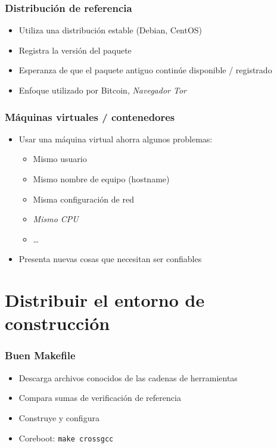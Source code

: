 \documentclass[14pt,aspectratio=169]{beamer}
\begin{document}
\begin{frame}
 \frametitle{Distribución de referencia}

 \begin{itemize}
  \item Utiliza una distribución estable (Debian, CentOS)
  \item Registra la versión del paquete
  \item Esperanza de que el paquete antiguo continúe disponible / registrado
  \item Enfoque utilizado por Bitcoin, \textit{Navegador Tor}
 \end{itemize}
\end{frame}

\begin{frame}
 \frametitle{Máquinas virtuales / contenedores}

 \begin{itemize}
  \item Usar una máquina virtual ahorra algunos problemas:
   \begin{itemize}
    \item Mismo usuario
    \item Mismo nombre de equipo (hostname)
    \item Misma configuración de red
    \item \textit{Mismo CPU}
    \item …
   \end{itemize}
  \item Presenta nuevas cosas que necesitan ser confiables
 \end{itemize}
\end{frame}

\section{Distribuir el entorno de construcción}

\begin{frame}
 \frametitle{Buen Makefile}

 \begin{itemize}
  \item Descarga archivos conocidos de las cadenas de herramientas
  \item Compara sumas de verificación de referencia
  \item Construye y configura
  \item Coreboot: \texttt{make crossgcc}
 \end{itemize}
\end{frame}
\end{document}
